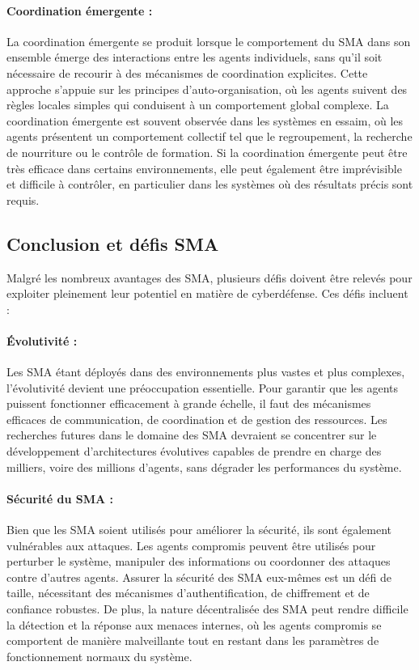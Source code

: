 \paragraph{Coordination émergente :}
La coordination émergente se produit lorsque le comportement du SMA dans son ensemble émerge des interactions entre les agents individuels, sans qu'il soit nécessaire de recourir à des mécanismes de coordination explicites. Cette approche s'appuie sur les principes d'auto-organisation, où les agents suivent des règles locales simples qui conduisent à un comportement global complexe. La coordination émergente est souvent observée dans les systèmes en essaim, où les agents présentent un comportement collectif tel que le regroupement, la recherche de nourriture ou le contrôle de formation. Si la coordination émergente peut être très efficace dans certains environnements, elle peut également être imprévisible et difficile à contrôler, en particulier dans les systèmes où des résultats précis sont requis.

\subsection{Conclusion et défis SMA}

Malgré les nombreux avantages des SMA, plusieurs défis doivent être relevés pour exploiter pleinement leur potentiel en matière de cyberdéfense. Ces défis incluent :

\paragraph{Évolutivité :}
Les SMA étant déployés dans des environnements plus vastes et plus complexes, l'évolutivité devient une préoccupation essentielle. Pour garantir que les agents puissent fonctionner efficacement à grande échelle, il faut des mécanismes efficaces de communication, de coordination et de gestion des ressources. Les recherches futures dans le domaine des SMA devraient se concentrer sur le développement d'architectures évolutives capables de prendre en charge des milliers, voire des millions d'agents, sans dégrader les performances du système.

\paragraph{Sécurité du SMA :}
Bien que les SMA soient utilisés pour améliorer la sécurité, ils sont également vulnérables aux attaques. Les agents compromis peuvent être utilisés pour perturber le système, manipuler des informations ou coordonner des attaques contre d'autres agents. Assurer la sécurité des SMA eux-mêmes est un défi de taille, nécessitant des mécanismes d'authentification, de chiffrement et de confiance robustes. De plus, la nature décentralisée des SMA peut rendre difficile la détection et la réponse aux menaces internes, où les agents compromis se comportent de manière malveillante tout en restant dans les paramètres de fonctionnement normaux du système.

